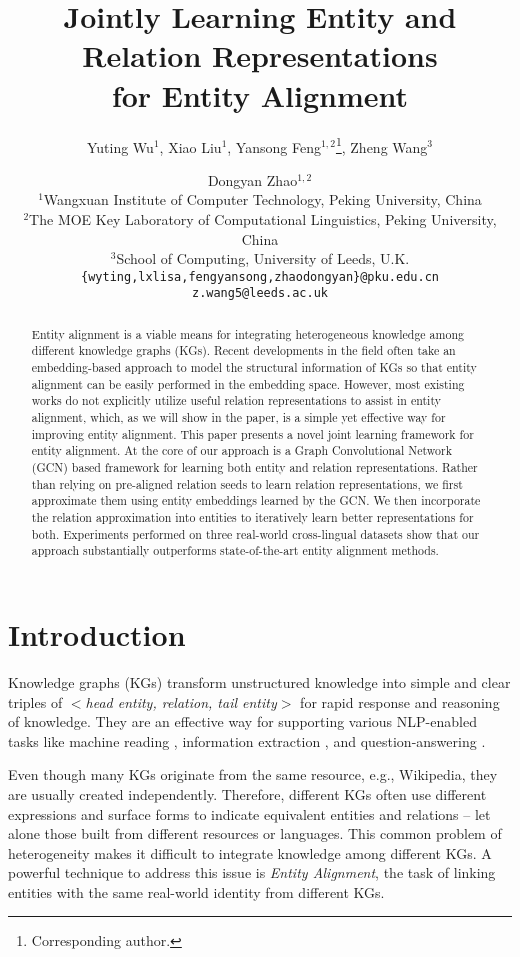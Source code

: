 \documentclass[11pt,a4paper]{article}
\title{Jointly Learning Entity and Relation Representations \\for Entity Alignment}
\author{
	Yuting Wu$^{1}$, 
	Xiao Liu$^{1}$, 
	Yansong Feng$^{1,2}$\thanks{\;\;Corresponding author.},  
	Zheng Wang$^{3}$ \and
	Dongyan Zhao$^{1,2}$ \\
	$^1$Wangxuan Institute of Computer Technology, Peking University, China\\
	$^2$The MOE Key Laboratory of Computational Linguistics, Peking University, China\\
	$^3$School of Computing, University of Leeds, U.K. \\
	{\tt \{wyting,lxlisa,fengyansong,zhaodongyan\}@pku.edu.cn} \\
	{\tt z.wang5@leeds.ac.uk}\\
}
\date{}
\begin{document}
\maketitle

	\begin{abstract} Entity alignment is a viable means for integrating heterogeneous knowledge among different knowledge graphs (KGs). Recent developments in the field often take an embedding-based approach to model the structural information of KGs so that entity alignment can be easily performed in the embedding space. However, most existing works do not explicitly utilize useful relation representations to assist in entity alignment, which, as we will show in the paper, is a simple yet effective way for improving entity alignment. This paper presents a novel joint learning framework for entity alignment. At the core of our approach is a Graph Convolutional Network (GCN) based framework for learning both entity and relation representations. Rather than relying on pre-aligned relation seeds to learn relation representations, we first approximate them using entity embeddings learned by the GCN. We then incorporate the relation approximation into entities to iteratively learn better representations for both. Experiments performed on three real-world cross-lingual datasets show that our approach substantially outperforms state-of-the-art entity alignment methods.
	
\end{abstract}

	
\section{Introduction}
\label{section:intro}
Knowledge graphs (KGs) transform unstructured knowledge into simple and clear triples of $<$\emph{head entity, relation, tail entity}$>$
for rapid response and reasoning of knowledge. They are an effective way for supporting various NLP-enabled tasks like machine reading \cite{yang2017kblstm}, information extraction \cite{wang2018label}, and question-answering
\cite{zhang2018variational}.

Even though many KGs originate from the same resource, e.g., Wikipedia, they are usually created independently. Therefore, different KGs often use different expressions and surface forms to
indicate equivalent entities and relations -- let alone
those built from different resources or languages. This common problem of heterogeneity makes it difficult to integrate knowledge among different KGs. 
A powerful technique to address this issue is \emph{Entity Alignment}, the task of linking entities with the same real-world identity from
different KGs.
\end{document}
